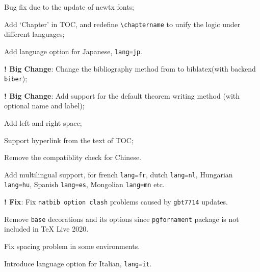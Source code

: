 \documentclass[11pt,bibtex]{elegantbook}
\begin{document}

\begin{change}
  \item Bug fix due to the update of newtx fonts;
  \item Add `Chapter' in TOC, and redefine \lstinline{\chaptername} to unify the logic under different languages;
  \item Add language option for Japanese, \lstinline{lang=jp}.
\end{change}



\begin{change}
  \item \textbf{! Big Change}: Change the bibliography method from  to biblatex(with backend  \lstinline{biber});
  \item \textbf{! Big Change}: Add support for the default theorem writing method (with optional name and label);
  \item Add left and right space;
  \item Support hyperlink from the text of TOC;
  \item Remove the  compatiblity check for Chinese.
  \item Add multilingual support, for french \lstinline{lang=fr}, dutch \lstinline{lang=nl}, Hungarian  \lstinline{lang=hu}, Spanish \lstinline{lang=es}, Mongolian \lstinline{lang=mn} etc.
\end{change}



\begin{change}
  \item \textbf{! Fix}: Fix \lstinline{natbib option clash} problems caused by \lstinline{gbt7714} updates.
  \item Remove \lstinline{base} decorations and its options since \lstinline{pgfornament} package is not included in \TeX{} Live 2020.
  \item Fix spacing problem in some environments.
  \item Introduce language option for Italian, \lstinline{lang=it}.
\end{change}


\end{document}
